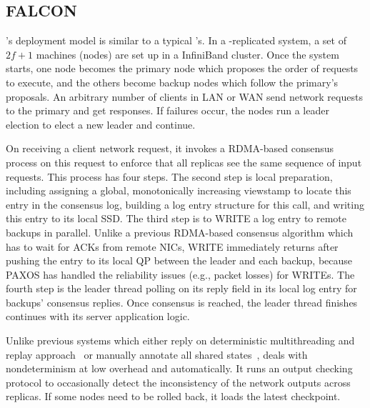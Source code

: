 \subsection{FALCON} \label{sec:falcon}

\smrsystem's deployment model is similar to a typical \smr's. In a \smrsystem-replicated 
system, a set of $2f+1$ machines (nodes) are set up in a InfiniBand cluster. Once the 
\smrsystem system starts, one node becomes the primary node which proposes the order of 
requests to execute, and the others become backup nodes which follow the primary’s 
proposals. An arbitrary number of clients in LAN or WAN send network requests to the 
primary and get responses. If failures occur, the nodes run a leader election to elect 
a new leader and continue.

On receiving a client network request, it invokes a RDMA-based consensus process on this 
request to enforce that all replicas see the same sequence of input requests. This process 
has four steps. The second step is local preparation, including assigning a global, monotonically 
increasing viewstamp to locate this entry in the consensus log, building a log entry structure 
for this call, and writing this entry to its local SSD. The third step is to WRITE a log entry to 
remote backups in parallel. Unlike a previous RDMA-based consensus algorithm which has to wait for
ACKs from remote NICs, WRITE immediately returns after pushing the entry to its local QP 
between the leader and each backup, because PAXOS has handled the reliability issues (e.g., packet 
losses) for WRITEs. The fourth step is the leader thread polling on its reply field in its local 
log entry for backups’ consensus replies. Once consensus is reached, the leader thread finishes 
continues with its server application logic. 

Unlike previous \smr systems which either reply on deterministic multithreading and replay
approach~\cite{rex:eurosys14} or manually annotate all shared states~\cite{eve:osdi12}, 
\smrsystem deals with nondeterminism at low overhead and automatically. It runs an output 
checking protocol to occasionally detect the inconsistency of the network outputs across replicas. 
If some nodes need to be rolled back, it loads the latest checkpoint. 
